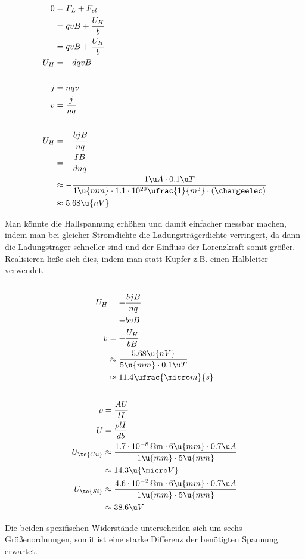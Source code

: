 \documentclass[11pt]{article}
\begin{document}
\subsection{}
\begin{align*}
    0 &= F_L + F_{el}\\
    &= q v B + \frac{U_H}{b}\\
    &= q v B + \frac{U_H}{b}\\
    U_H &= -dqvB\\
    \\
    j &= n q v\\
    v &= \frac{j}{nq}\\
    \\
    U_H &= -\frac{b j B}{n q}\\
    &= -\frac{I B}{d n q}\\
    &\approx -\frac{1\u A \cdot 0.1\u T}{1\u{mm}\cdot1.1\cdot 10^{29}\ufrac{1}{m^3}\cdot (\chargeelec)}\\
    &\approx 5.68\u{nV}
\end{align*}
\begin{adjustwidth}{20pt}{}
    Man könnte die Hallspannung erhöhen und damit einfacher messbar machen,
    indem man bei gleicher Stromdichte die Ladungsträgerdichte verringert, 
    da dann die Ladungsträger schneller sind und der Einfluss der Lorenzkraft
    somit größer. Realisieren ließe sich dies, indem man statt Kupfer z.B. einen
    Halbleiter verwendet.
\end{adjustwidth}

\subsection{}
\begin{align*}
    U_H &= -\frac{b j B}{n q}\\
    &= -b v B\\
    v &= -\frac{U_H}{b B}\\
    &\approx \frac{5.68\u{nV}}{5\u{mm}\cdot 0.1\u T}\\
    &\approx 11.4\ufrac{\micro m}{s}
\end{align*}

\subsection{}
\begin{align*}
    \rho &= \frac{A U}{l I}\\
    U &= \frac{\rho l I}{d b}\\
    U_{\te{Cu}} &\approx \frac{1.7\cdot 10^{-8}\,\Omega\mathrm m \cdot 6\u{mm} \cdot 0.7 \u A}{1\u{mm} \cdot 5\u{mm}}\\
    &\approx 14.3\u {\micro V}\\
    U_{\te{Si}} &\approx \frac{4.6\cdot 10^{-2}\,\Omega\mathrm m \cdot 6\u{mm} \cdot 0.7 \u A}{1\u{mm} \cdot 5\u{mm}}\\
    &\approx 38.6 \u V
\end{align*}
\begin{adjustwidth}{20pt}{}
    Die beiden spezifischen Widerstände unterscheiden sich um sechs Größenordnungen,
    somit ist eine starke Differenz der benötigten Spannung erwartet.
\end{adjustwidth}
\end{document}
